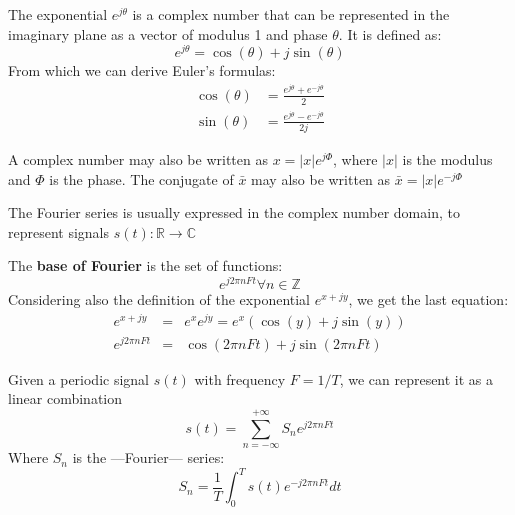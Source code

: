 \begin{definition}
   The exponential $e^{j\theta}$ is a complex number that can be represented in the imaginary plane as a vector of modulus 1 and phase $\theta$. It is defined as:
   \begin{equation}
      e^{j\theta} = \cos(\theta) + j\sin(\theta)
   \end{equation}
   From which we can derive Euler's formulas:
   \begin{align}
      \cos(\theta) & = \frac{e^{j\theta} + e^{-j\theta}}{2}\\
      \sin(\theta) & = \frac{e^{j\theta} - e^{-j\theta}}{2j}
   \end{align}
\end{definition}

A complex number may also be written as $x = |x|e^{j\Phi}$, where $|x|$ is the modulus and $\Phi$ is the phase.
The conjugate of $\bar{x}$ may also be written as $\bar{x} = |x|e^{-j\Phi}$

The Fourier series is usually expressed in the complex number domain, to represent signals $s(t): \mathbb{R} \rightarrow \mathbb{C}$

The \textbf{base of Fourier} is the set of functions:
\begin{equation}
   e^{j2\pi n F t} \forall n \in \mathbb{Z}
\end{equation}
Considering also the definition of the exponential $e^{x + jy}$, we get the last equation:
\begin{align}
   e^{x + jy} & = & e^x e^{jy} =e^x(\cos(y) + j\sin(y))\\
   e^{j2\pi n F t} & = & \cos(2\pi n F t) + j\sin(2\pi n F t)
\end{align}
\nl


\newpage
\begin{definition}
   Given a periodic signal $s(t)$ with frequency $F = 1/T$, we can represent it as a linear combination
   \begin{equation}
      s(t) = \sum_{n=-\infty}^{+\infty} S_n e^{j2\pi n F t}
   \end{equation} 
   Where $S_n$ is the ---Fourier--- series:
   \begin{equation}
      S_n = \frac{1}{T} \int_0^T s(t) e^{-j2\pi n F t} dt
   \end{equation}
\end{definition}

